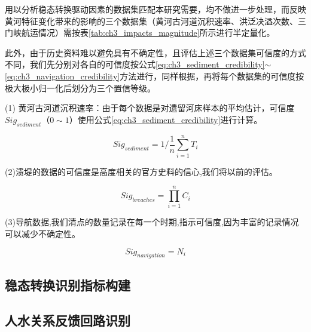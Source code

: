 

用以分析稳态转换驱动因素的数据集匹配本研究需要，均不做进一步处理，而反映黄河特征变化带来的影响的三个数据集（黄河古河道沉积速率、洪泛决溢次数、三门峡航运情况）需按表\ref{tab:ch3_impacts_magnitude}所示进行半定量化。



此外，由于历史资料难以避免具有不确定性，且评估上述三个数据集可信度的方式不同，我们先分别对各自的可信度按公式\ref{eq:ch3_sediment_credibility}$\sim$\ref{eq:ch3_navigation_credibility}方法进行，同样根据，再将每个数据集的可信度按极大极小归一化后划分为三个置信等级。

(1) 黄河古河道沉积速率：由于每个数据是对遗留河床样本的平均估计，可信度 $Sig_{sediment}$（$0\sim1$）使用公式\ref{eq:ch3_sediment_credibility}进行计算。

\begin{equation}
    \label{eq:ch3_sediment_credibility}
    Sig_{sediment} = 1 / \frac{1}{n} \sum_{i=1}^n T_i
\end{equation}

(2)溃堤的数据的可信度是高度相关的官方史料的信心,我们将以前的评估。

\begin{equation}
    \label{eq:ch3_breaches_credibility}
    Sig_{breaches} = \prod_{i=1}^n C_i
\end{equation}

(3)导航数据,我们清点的数量记录在每一个时期,指示可信度,因为丰富的记录情况可以减少不确定性。

\begin{equation}
    \label{eq:ch3_navigation_credibility}
    Sig_{navigation} = N_i
\end{equation}


\subsection{稳态转换识别指标构建}

\subsection{人水关系反馈回路识别}
